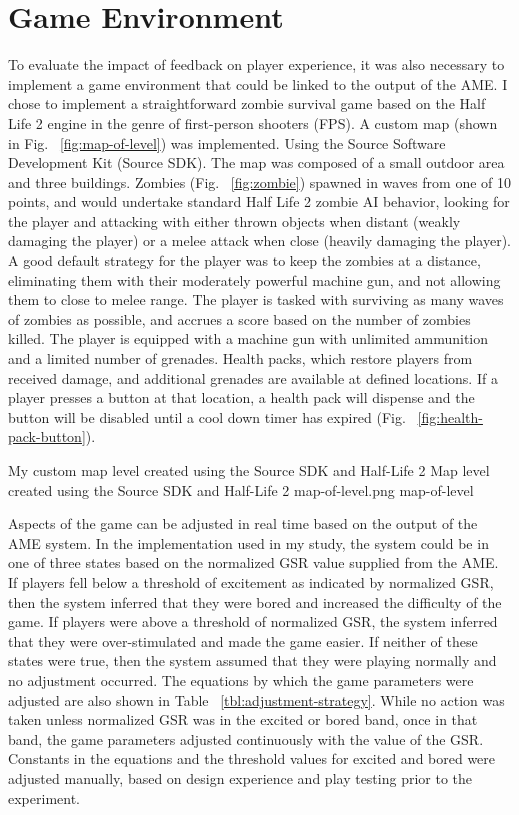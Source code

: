 \section{Game Environment}
To evaluate the impact of feedback on player experience, it was also necessary to implement a game environment that could be linked to the output of the AME. I chose to implement a straightforward zombie survival game based on the Half Life 2 engine in the genre of first-person shooters (FPS). A custom map (shown in Fig. ~\ref{fig:map-of-level}) was implemented. Using the Source Software Development Kit (Source SDK). The map was composed of a small outdoor area and three buildings. Zombies (Fig. ~\ref{fig:zombie}) spawned in waves from one of 10 points, and would undertake standard Half Life 2 zombie AI behavior, looking for the player and attacking with either thrown objects when distant (weakly damaging the player) or a melee attack when close (heavily damaging the player). A good default strategy for the player was to keep the zombies at a distance, eliminating them with their moderately powerful machine gun, and not allowing them to close to melee range. The player is tasked with surviving as many waves of zombies as possible, and accrues a score based on the number of zombies killed. The player is equipped with a machine gun with unlimited ammunition and a limited number of grenades. Health packs, which restore players from received damage, and additional grenades are available at defined locations. If a player presses a button at that location, a health pack will dispense and the button will be disabled until a cool down timer has expired (Fig. ~\ref{fig:health-pack-button}).

\largeimg
{My custom map level created using the Source SDK and Half-Life 2}
{Map level created using the Source SDK and Half-Life 2}
{map-of-level.png}
{map-of-level}

Aspects of the game can be adjusted in real time based on the output of the AME system. In the implementation used in my study, the system could be in one of three states based on the normalized GSR value supplied from the AME. If players fell below a threshold of excitement as indicated by normalized GSR, then the system inferred that they were bored and increased the difficulty of the game. If players were above a threshold of normalized GSR, the system inferred that they were over-stimulated and made the game easier. If neither of these states were true, then the system assumed that they were playing normally and no adjustment occurred. The equations by which the game parameters were adjusted are also shown in Table ~\ref{tbl:adjustment-strategy}. While no action was taken unless normalized GSR was in the excited or bored band, once in that band, the game parameters adjusted continuously with the value of the GSR. Constants in the equations and the threshold values for excited and bored were adjusted manually, based on design experience and play testing prior to the experiment.

